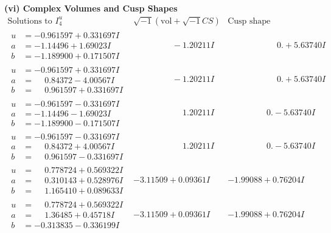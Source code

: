\documentclass[1p]{elsarticle_modified}
\theoremstyle{definition}
\newcommand{\I}{\sqrt{-1}}
\begin{document}
\newpage\flushleft \textbf{(vi) Complex Volumes and Cusp Shapes}
$$\begin{array}{c|c|c}  
\text{Solutions to }I^u_{4}& \I (\text{vol} + \sqrt{-1}CS) & \text{Cusp shape}\\
 \hline 
\begin{aligned}
u &= -0.961597 + 0.331697 I \\
a &= -1.14496 + 1.69023 I \\
b &= -1.189900 + 0.171507 I\end{aligned}
 & \phantom{-0.000000 } -1.20211 I & \phantom{-0.000000 -}0. + 5.63740 I \\ \hline\begin{aligned}
u &= -0.961597 + 0.331697 I \\
a &= \phantom{-}0.84372 - 4.00567 I \\
b &= \phantom{-}0.961597 + 0.331697 I\end{aligned}
 & \phantom{-0.000000 } -1.20211 I & \phantom{-0.000000 -}0. + 5.63740 I \\ \hline\begin{aligned}
u &= -0.961597 - 0.331697 I \\
a &= -1.14496 - 1.69023 I \\
b &= -1.189900 - 0.171507 I\end{aligned}
 & \phantom{-0.000000 -}1.20211 I & \phantom{-0.000000 } 0. - 5.63740 I \\ \hline\begin{aligned}
u &= -0.961597 - 0.331697 I \\
a &= \phantom{-}0.84372 + 4.00567 I \\
b &= \phantom{-}0.961597 - 0.331697 I\end{aligned}
 & \phantom{-0.000000 -}1.20211 I & \phantom{-0.000000 } 0. - 5.63740 I \\ \hline\begin{aligned}
u &= \phantom{-}0.778724 + 0.569322 I \\
a &= \phantom{-}0.310143 + 0.528976 I \\
b &= \phantom{-}1.165410 + 0.089633 I\end{aligned}
 & -3.11509 + 0.09361 I & -1.99088 + 0.76204 I \\ \hline\begin{aligned}
u &= \phantom{-}0.778724 + 0.569322 I \\
a &= \phantom{-}1.36485 + 0.45718 I \\
b &= -0.313835 - 0.336199 I\end{aligned}
 & -3.11509 + 0.09361 I & -1.99088 + 0.76204 I \\ \hline\begin{aligned}

\end{aligned}
\end{array}$$
\end{document}
